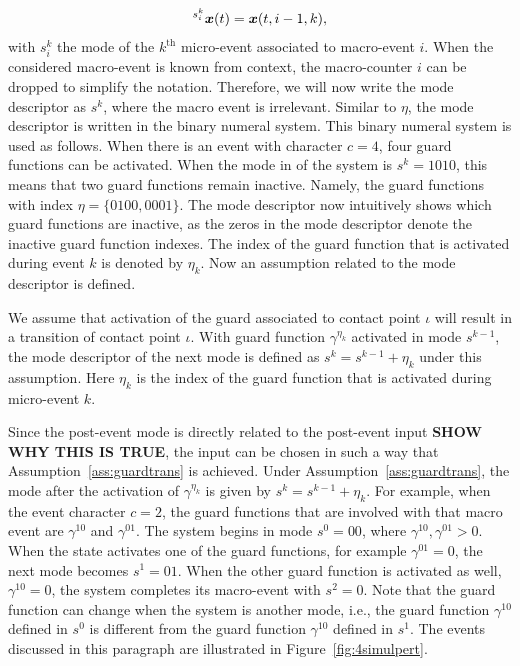 \documentclass[../DC2017114Bouma.tex]{subfiles}
\begin{document}
\begin{align}
\hspace{0cm}^{s^k_i}{\boldsymbol{x}}(t) = {\boldsymbol{x}}(t,i-1,k),
\end{align}
with $s^k_i$ the mode of the $k^{\text{th}}$ micro-event associated to macro-event $i$. When the considered macro-event is known from context, the macro-counter $i$ can be dropped to simplify the notation. Therefore, we will now write the mode descriptor as $s^k$, where the macro event is irrelevant. Similar to $\eta$, the mode descriptor is written in the binary numeral system. This binary numeral system is used as follows. When there is an event with character $c = 4$, four guard functions can be activated. When the mode in of the system is $s^k = 1010$, this means that two guard functions remain inactive. Namely, the guard functions with index $\eta = \{0100,0001\}$. The mode descriptor now intuitively shows which guard functions are inactive, as the zeros in the mode descriptor denote the inactive guard function indexes. The index of the guard function that is activated during event $k$ is denoted by $\eta_k$. Now an assumption related to the mode descriptor is defined.

\begin{myass}\label{ass:guardtrans}
We assume that activation of the guard associated to contact point $\iota$ will result in a transition of contact point $\iota$. With guard function $\gamma^{\eta_k}$ activated in mode $s^{k-1}$, the mode descriptor of the next mode is defined as $s^{k} = s^{k-1} + \eta_k$ under this assumption. Here $\eta_k$ is the index of the guard function that is activated during micro-event $k$.
\end{myass}

Since the post-event mode is directly related to the post-event input \textbf{SHOW WHY THIS IS TRUE}, the input can be chosen in such a way that Assumption~\ref{ass:guardtrans} is achieved. Under Assumption~\ref{ass:guardtrans}, the mode after the activation of $\gamma^{\eta_k}$ is given by $s^{k} = s^{k-1} + \eta_k$. For example, when the event character $c = 2$, the guard functions that are involved with that macro event are $\gamma^{10}$ and $\gamma^{01}$. The system begins in mode $s^0 = 00$, where $\gamma^{10},\gamma^{01}>0$. When the state activates one of the guard functions, for example $\gamma^{01}=0$, the next mode becomes $s^1 = 01$. When the other guard function is activated as well, $\gamma^{10} = 0$, the system completes its macro-event with $s^2 = 0$. Note that the guard function can change when the system is another mode, i.e., the guard function $\gamma^{10}$ defined in $s^0$ is different from the guard function $\gamma^{10}$ defined in $s^1$. The events discussed in this paragraph are illustrated in Figure~\ref{fig:4simulpert}.
\end{document}
